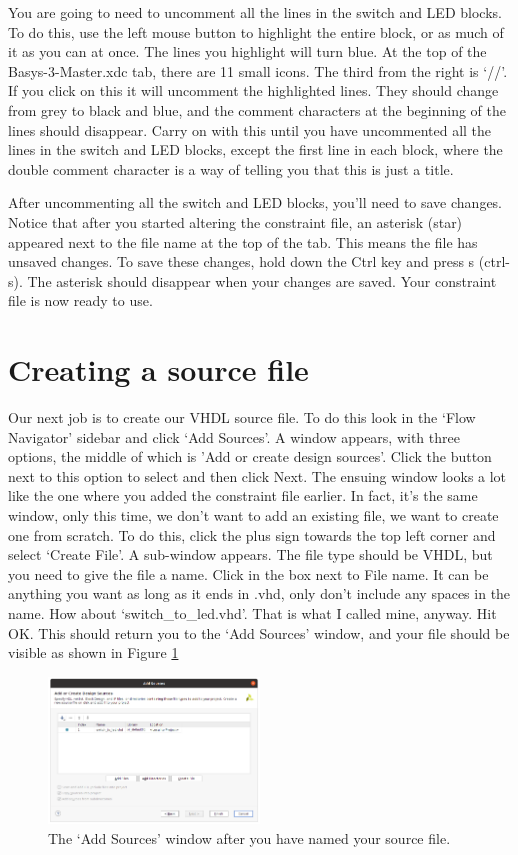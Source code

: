 \documentclass[../physical_computing.tex]{subfiles}
\begin{document}
You are going to need to uncomment all the lines in the switch and LED blocks. To do this, use the left mouse button to highlight the entire block, or as much of it as you can at once. The lines you highlight will turn blue. At the top of the Basys-3-Master.xdc tab, there are 11 small icons. The third from the right is `//'. If you click on this it will uncomment the highlighted lines. They should change from grey to black and blue, and the comment characters at the beginning of the lines should disappear. Carry on with this until you have uncommented all the lines in the switch and LED blocks, except the first line in each block, where the double comment character is a way of telling you that this is just a title.

After uncommenting all the switch and LED blocks, you'll need to save changes. Notice that after you started altering the constraint file, an asterisk (star) appeared next to the file name at the top of the tab. This means the file has unsaved changes. To save these changes, hold down the Ctrl key and press s (ctrl-s). The asterisk should disappear when your changes are saved. Your constraint file is now ready to use.

\section{Creating a source file}
\label{sec:sourcefile}

Our next job is to create our VHDL source file. To do this look in the `Flow Navigator' sidebar and click `Add Sources'. A window appears, with three options, the middle of which is 'Add or create design sources'. Click the button next to this option to select and then click Next. The ensuing window looks a lot like the one where you added the constraint file earlier. In fact, it's the same window, only this time, we don't want to add an existing file, we want to create one from scratch. To do this, click the plus sign towards the top left corner and select `Create File'. A sub-window appears. The file type should be VHDL, but you need to give the file a name. Click in the box next to File name. It can be anything you want as long as it ends in .vhd, only don't include any spaces in the name. How about `switch\_to\_led.vhd'. That is what I called mine, anyway. Hit OK. This should return you to the `Add Sources' window, and your file should be visible as shown in Figure \ref{fig:add_sources}

\begin{figure}[htbp]
    \centering
    \includegraphics[width=0.5\textwidth]{figures/add_sources.png}
    \caption{The `Add Sources' window after you have named your source file.}
    \label{fig:add_sources}
\end{figure}
\end{document}
